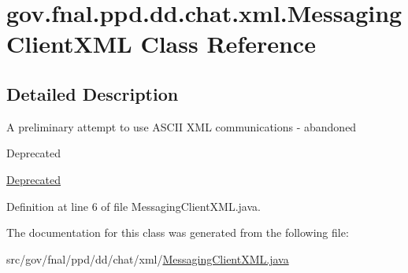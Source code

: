 \hypertarget{classgov_1_1fnal_1_1ppd_1_1dd_1_1chat_1_1xml_1_1MessagingClientXML}{\section{gov.\-fnal.\-ppd.\-dd.\-chat.\-xml.\-Messaging\-Client\-X\-M\-L Class Reference}
\label{classgov_1_1fnal_1_1ppd_1_1dd_1_1chat_1_1xml_1_1MessagingClientXML}
}


\subsection{Detailed Description}
A preliminary attempt to use A\-S\-C\-I\-I X\-M\-L communications -\/ abandoned \begin{DoxyRefDesc}{Deprecated}
\item[\hyperlink{deprecated__deprecated000005}{Deprecated}]\end{DoxyRefDesc}


Definition at line 6 of file Messaging\-Client\-X\-M\-L.\-java.



The documentation for this class was generated from the following file\-:\begin{DoxyCompactItemize}
\item 
src/gov/fnal/ppd/dd/chat/xml/\hyperlink{MessagingClientXML_8java}{Messaging\-Client\-X\-M\-L.\-java}\end{DoxyCompactItemize}
